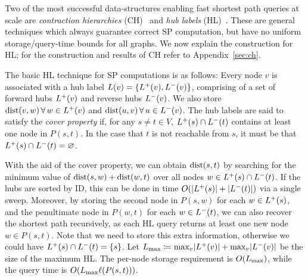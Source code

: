 Two of the most successful data-structures enabling fast shortest path queries at scale are \emph{contraction hierarchies} (CH)~\cite{geisberger_ch_definition} and \emph{hub labels} (HL)~\cite{cohen_definition_hl}.
These are general techniques which always guarantee correct SP computation, but have no uniform storage/query-time bounds for all graphs. 
We now explain the construction for HL; for the construction and results of CH refer to Appendix~\ref{sec:ch}.

The basic HL technique for SP computations is as follows:
Every node $v$ is associated with a hub label $L(v) = \crl*{\Lf(v),\Lb(v)}$, comprising of a set of forward hubs $\Lf(v)$ and reverse hubs $\Lb(v)$.
We also store $\dist(v,w) \,\forall\, w\in\Lf(v)$ and $\dist(u,v)\,\forall\,u\in\Lb(v)$.
The hub labels are said to satisfy the \emph{cover property} if, for any $s\neq t\in V$, $\Lf(s)\cap\Lb(t)$ contains at least one node in $P(s,t)$.
In the case that $t$ is not reachable from $s$, it must be that $\Lf(s)\cap\Lb(t)=\varnothing$.

With the aid of the cover property, we can obtain $\dist(s,t)$ by searching for the minimum value of $\dist(s,w)+\dist(w,t)$ over all nodes $w\in\Lf(s)\cap\Lb(t)$.
If the hubs are sorted by ID, this can be done in time $\Or(\card{\Lf(s)}+\card{\Lb(t)})$ via a single sweep.
Moreover, by storing the second node in $P(s,w)$ for each $w\in \Lf(s)$, and the penultimate node in $P(w,t)$ for each $w\in \Lb(t)$, we can also recover the shortest path recursively, as each HL query returns at least one new node $w\in P(s,t)$.
Note that we need to store this extra information, otherwise we could have $\Lf(s)\cap\Lb(t)=\crl{s}$.
Let $\Lm \defeq \max_v\abs*{\Lf(v)}+\max_v\abs*{\Lb(v)}$ be the size of the maximum HL.
The per-node storage requirement is $\Or(\Lm)$, while the query time is $\Or(\Lm\ell(P(s,t)))$.

